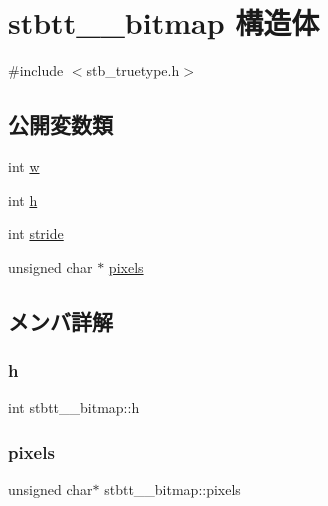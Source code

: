 \hypertarget{structstbtt____bitmap}{}\section{stbtt\+\_\+\+\_\+bitmap 構造体}
\label{structstbtt____bitmap}


{\ttfamily \#include $<$stb\+\_\+truetype.\+h$>$}

\subsection*{公開変数類}
\begin{DoxyCompactItemize}
\item 
int \mbox{\hyperlink{structstbtt____bitmap_afbd607426f0a457b1a871ed902eeb926}{w}}
\item 
int \mbox{\hyperlink{structstbtt____bitmap_a2afc802e26e9f1dda897ac16ecfff10e}{h}}
\item 
int \mbox{\hyperlink{structstbtt____bitmap_a48ee6b550ee4f1d85bfc32c62c0e9a98}{stride}}
\item 
unsigned char $\ast$ \mbox{\hyperlink{structstbtt____bitmap_ae6be77625faf55b110eaaffde5c7733c}{pixels}}
\end{DoxyCompactItemize}


\subsection{メンバ詳解}
\mbox{\label{structstbtt____bitmap_a2afc802e26e9f1dda897ac16ecfff10e}} 
\subsubsection{\texorpdfstring{h}{h}}
{\footnotesize\ttfamily int stbtt\+\_\+\+\_\+bitmap\+::h}

\mbox{\label{structstbtt____bitmap_ae6be77625faf55b110eaaffde5c7733c}} 
\subsubsection{\texorpdfstring{pixels}{pixels}}
{\footnotesize\ttfamily unsigned char$\ast$ stbtt\+\_\+\+\_\+bitmap\+::pixels}

